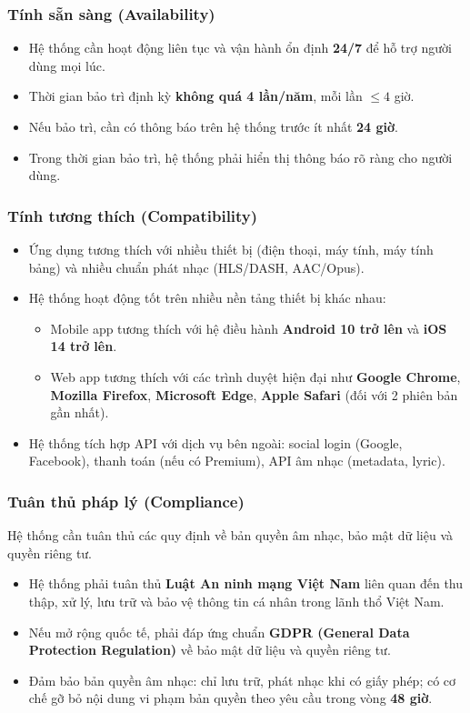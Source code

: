 \documentclass[a4paper]{article}
\begin{document}
\subsubsection{Tính sẵn sàng (Availability)}
  \begin{itemize}
      \item Hệ thống cần hoạt động liên tục và vận hành ổn định \textbf{24/7} để hỗ trợ người dùng mọi lúc.
      \item Thời gian bảo trì định kỳ \textbf{không quá 4 lần/năm}, mỗi lần $\leq 4$ giờ.
      \item Nếu bảo trì, cần có thông báo trên hệ thống trước ít nhất \textbf{24 giờ}.
      \item Trong thời gian bảo trì, hệ thống phải hiển thị thông báo rõ ràng cho người dùng.
  \end{itemize}

\subsubsection{Tính tương thích (Compatibility)}
  \begin{itemize}
      \item Ứng dụng tương thích với nhiều thiết bị (điện thoại, máy tính, máy tính bảng) và nhiều chuẩn phát nhạc (HLS/DASH, AAC/Opus).
      \item Hệ thống hoạt động tốt trên nhiều nền tảng thiết bị khác nhau:
      \begin{itemize}
          \item Mobile app tương thích với hệ điều hành \textbf{Android 10 trở lên} và \textbf{iOS 14 trở lên}.
          \item Web app tương thích với các trình duyệt hiện đại như \textbf{Google Chrome}, \textbf{Mozilla Firefox}, \textbf{Microsoft Edge}, \textbf{Apple Safari} (đối với 2 phiên bản gần nhất).
      \end{itemize}
      \item Hệ thống tích hợp API với dịch vụ bên ngoài: social login (Google, Facebook), thanh toán (nếu có Premium), API âm nhạc (metadata, lyric).
  \end{itemize}

\subsubsection{Tuân thủ pháp lý (Compliance)}
  Hệ thống cần tuân thủ các quy định về bản quyền âm nhạc, bảo mật dữ liệu và quyền riêng tư.
  \begin{itemize}
      \item Hệ thống phải tuân thủ \textbf{Luật An ninh mạng Việt Nam} liên quan đến thu thập, xử lý, lưu trữ và bảo vệ thông tin cá nhân trong lãnh thổ Việt Nam.
      \item Nếu mở rộng quốc tế, phải đáp ứng chuẩn \textbf{GDPR (General Data Protection Regulation)} về bảo mật dữ liệu và quyền riêng tư.
      \item Đảm bảo bản quyền âm nhạc: chỉ lưu trữ, phát nhạc khi có giấy phép; có cơ chế gỡ bỏ nội dung vi phạm bản quyền theo yêu cầu trong vòng \textbf{48 giờ}.
  \end{itemize}
\end{document}
